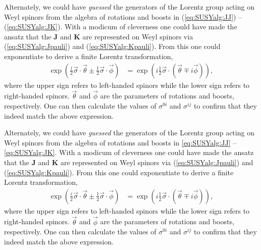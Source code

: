 Alternately, we could have \textit{guessed} the generators of the Lorentz group acting on Weyl spinors from the algebra of rotations and boosts in (\ref{eq:SUSYalg:JJ}) -- (\ref{eq:SUSYalg:JK}). With a modicum of cleverness one could have made the ansatz that the $\mathbf J$ and $\mathbf K$ are represented on Weyl spinors via (\ref{eq:SUSYalg:Jpauli}) and (\ref{eq:SUSYalg:Kpauli}). From this one could exponentiate to derive a finite Lorentz transformation,
\begin{align}
    \exp\left({\frac i2 \vec\sigma\cdot\vec\theta \pm \frac 12 \vec\sigma\cdot\vec\phi}\right) &= \exp\left({i\frac 12 \vec\sigma\cdot(\vec\theta \mp i\vec\phi)}\right),
\end{align}
where the upper sign refers to left-handed spinors while the lower sign refers to right-handed spinors. $\vec \theta$ and $\vec \phi$ are the parameters of rotations and boosts, respectively. One can then calculate the values of $\sigma^{0i}$ and $\sigma^{ij}$ to confirm that they indeed match the above expression.

Alternately, we could have \textit{guessed} the generators of the Lorentz group acting on Weyl spinors from the algebra of rotations and boosts in \eqref{eq:SUSYalg:JJ} -- \eqref{eq:SUSYalg:JK}. With a modicum of cleverness one could have made the ansatz that the $\mathbf J$ and $\mathbf K$ are represented on Weyl spinors via (\ref{eq:SUSYalg:Jpauli}) and (\ref{eq:SUSYalg:Kpauli}). From this one could exponentiate to derive a finite Lorentz transformation,
\begin{align}
    \exp\left({\frac i2 \vec\sigma\cdot\vec\theta \pm \frac 12 \vec\sigma\cdot\vec\phi}\right) &= \exp\left({i\frac 12 \vec\sigma\cdot(\vec\theta \mp i\vec\phi)}\right),
\end{align}
where the upper sign refers to left-handed spinors while the lower sign refers to right-handed spinors. $\vec \theta$ and $\vec \phi$ are the parameters of rotations and boosts, respectively. One can then calculate the values of $\sigma^{0i}$ and $\sigma^{ij}$ to confirm that they indeed match the above expression.

